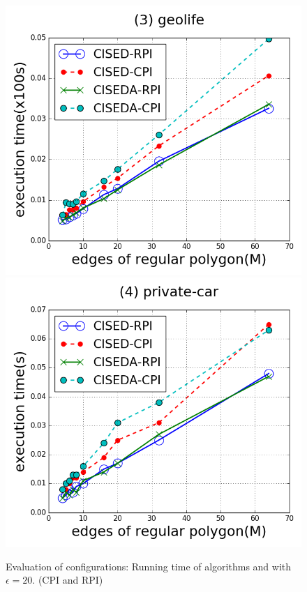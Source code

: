 \begin{figure}[tb!]
\includegraphics[scale = 0.250]{figures/Exp-M-e-20-time-geolife.png}
\includegraphics[scale = 0.250]{figures/Exp-M-e-20-time-private.png}
\vspace{-2ex}
\caption{\small Evaluation of configurations: Running time of algorithms \cist and \cista with $\epsilon = 20$. (CPI and RPI) }
\label{fig:m-time-e20}
\vspace{-1ex}
\end{figure}

